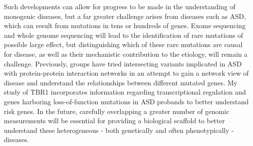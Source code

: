 Such developments can allow for progress to be made in the understanding of monogenic diseases, but a far greater challenge arises from diseases such as ASD, which can result from mutations in tens or hundreds of genes. Exome sequencing and whole genome sequencing will lead to the identification of rare mutations of possible large effect, but distinguishing which of these rare mutations are causal for disease, as well as their mechanistic contribution to the etiology, will remain a challenge.  Previously, groups have tried intersecting variants implicated in ASD with protein-protein interaction networks in an attempt to gain a network view of disease and understand the relationships between different mutated genes. My study of TBR1 incorporates information regarding transcriptional regulation and genes harboring loss-of-function mutations in ASD probands to better understand risk genes. In the future, carefully overlapping a greater number of genomic measurements will be essential for providing a biological scaffold to better understand these heterogeneous - both genetically and often phenotypically - diseases. 

